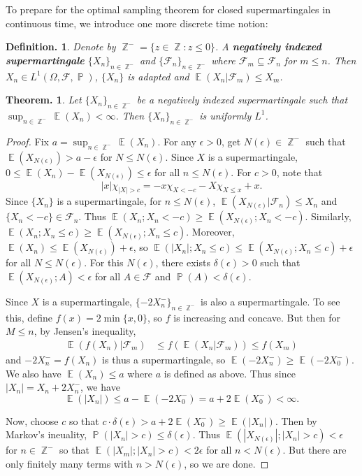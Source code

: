 \documentclass[11pt, a4paper]{memoir}
\DeclareMathOperator{\Z}{{\mathbb{Z}}}
\theoremstyle{change}
\newtheorem{theorem}{Theorem.}[section]
\theoremstyle{plain}
\theoremstyle{nonumberplain}
\newtheorem{definition}{Definition.}
\newtheorem{proof}{Proof}
\DeclareMathOperator{\pr}{{\mathbb{P}}}
\DeclareMathOperator{\E}{{\mathbb{E}}}
\newcommand{\defn}[1]{{\boldmath\bfseries #1}}
\numberwithin{equation}{section}
\begin{document}
To prepare for the optimal sampling theorem for closed supermartingales in continuous time, we introduce one more discrete time notion:
\begin{definition}
    Denote by $\Z^-=\{z\in\Z:z\leq 0\}$.
    A \defn{negatively indexed supermartingale} $\{X_n\}_{n\in\Z^-}$ and $\{\mathcal{F}_n\}_{n\in\Z^-}$ where $\mathcal{F}_m\subseteq\mathcal{F}_n$ for $m\leq n$.
    Then $X_n\in L^1(\Omega,\mathcal{F},\pr)$, $\{X_n\}$ is adapted and $\E(X_n|\mathcal{F}_m)\leq X_m$.
\end{definition}
\begin{theorem}
    Let $\{X_n\}_{n\in\Z^-}$ be a negatively indexed supermartingale such that $\sup_{n\in\Z^-}\E(X_n)<\infty$.
    Then $\{X_n\}_{n\in\Z^-}$ is uniformly $L^1$.
\end{theorem}
\begin{proof}
    Fix $a=\sup_{n\in\Z^-}\E(X_n)$.
    For any $\epsilon>0$, get $N(\epsilon)\in\Z^-$ such that $\E(X_{N(\epsilon)})>a-\epsilon$ for $N\leq N(\epsilon)$.
    Since $X$ is a supermartingale, $0\leq\E(X_n)-\E(X_{N(\epsilon)})\leq\epsilon$ for all $n\leq N(\epsilon)$.
    For $c>0$, note that
    \begin{equation*}
        |x|\chi_{|X|>c}=-x\chi_{X<-c}-X\chi_{X\leq x}+x.
    \end{equation*}
    Since $\{X_n\}$ is a supermartingale, for $n\leq N(\epsilon)$, $\E(X_{N(\epsilon)}|\mathcal{F}_n)\leq X_n$ and $\{X_n<-c\}\in\mathcal{F}_n$.
    Thus $\E(X_n;X_n<-c)\geq\E(X_{N(\epsilon)};X_n<-c)$.
    Similarly, $\E(X_n;X_n\leq c)\geq\E(X_{N(\epsilon)};X_n\leq c)$.
    Moreover, $\E(X_n)\leq\E(X_{N(\epsilon)})+\epsilon$, so $\E(|X_n|;X_n\leq c)\leq\E(X_{N(\epsilon)};X_n\leq c)+\epsilon$ for all $N\leq N(\epsilon)$.
    For this $N(\epsilon)$, there exists $\delta(\epsilon)>0$ such that $\E(X_{N(\epsilon)};A)<\epsilon$ for all $A\in\mathcal{F}$ and $\pr(A)<\delta(\epsilon)$.

    Since $X$ is a supermartingale, $\{-2X_n^-\}_{n\in\Z^-}$ is also a supermartingale.
    To see this, define $f(x)=2\min\{x,0\}$, so $f$ is increasing and concave.
    But then for $M\leq n$, by Jensen's inequality,
    \begin{align*}
        \E(f(X_n)|\mathcal{F}_m) &\leq f(\E(X_n|\mathcal{F}_m))\leq f(X_m)
    \end{align*}
    and $-2X_n^-=f(X_n)$ is thus a supermartingale, so $\E(-2X_n^-)\geq\E(-2X_0^-)$.
    We also have $\E(X_n)\leq a$ where $a$ is defined as above.
    Thus since $|X_n|=X_n+2X_n^-$, we have
    \begin{equation*}
        \E(|X_n|)\leq a-\E(-2X_0^-)=a+2\E(X_0^-)<\infty.
    \end{equation*}

    Now, choose $c$ so that $c\cdot\delta(\epsilon)>a+2\E(X_0^-)\geq\E(|X_n|)$.
    Then by Markov's ineuality, $\pr(|X_n|>c)\leq\delta(\epsilon)$.
    Thus $\E(|X_{N(\epsilon)}|;|X_n|>c)<\epsilon$ for $n\in\Z^-$ so that $\E(|X_m|;|X_n|>c)<2\epsilon$ for all $n<N(\epsilon)$.
    But there are only finitely many terms with $n>N(\epsilon)$, so we are done.
\end{proof}
\end{document}
